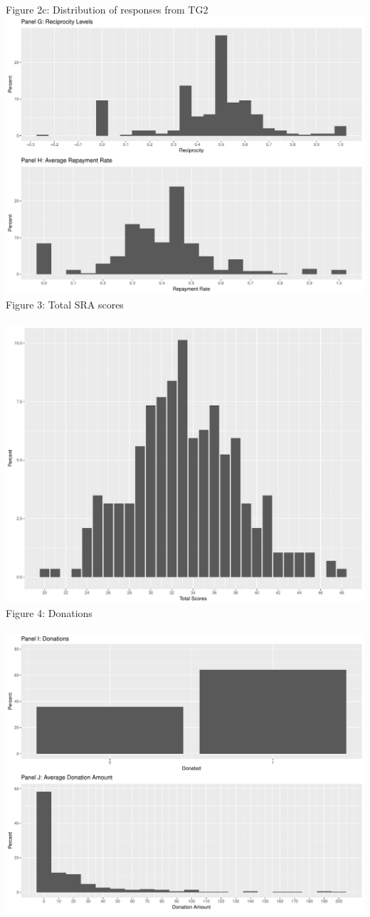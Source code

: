 \documentclass[12pt]{article}
\begin{document}
\noindent Figure 2c: Distribution of responses from TG2 \\
\includegraphics[scale=0.4]{Figure2c.pdf} \\



\noindent Figure 3: Total SRA scores\\ \\
\includegraphics[scale=0.35]{SRAimg}\\

\noindent Figure 4: Donations\\ \\
\includegraphics[scale=0.35]{Figure4.pdf}\\



	
\end{document}
